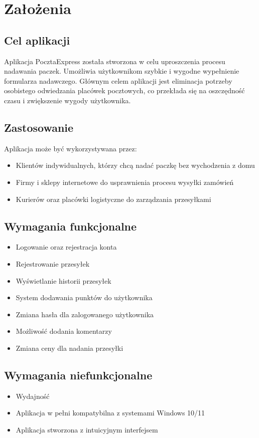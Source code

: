 \setcounter{section}{0}
\renewcommand{\thesection}{\arabic{section}}

\section{Założenia}
\subsection{Cel aplikacji}

Aplikacja PocztaExpress została stworzona w celu uproszczenia procesu nadawania paczek. Umożliwia użytkownikom szybkie i wygodne wypełnienie formularza nadawczego. Głównym celem aplikacji jest eliminacja potrzeby osobistego odwiedzania placówek pocztowych, co przekłada się na oszczędność czasu i zwiększenie wygody użytkownika.

\subsection{Zastosowanie}

Aplikacja może być wykorzystywana przez:
\begin{itemize}
\item Klientów indywidualnych, którzy chcą nadać paczkę bez wychodzenia z domu
\item Firmy i sklepy internetowe do usprawnienia procesu wysyłki zamówień
\item Kurierów oraz placówki logistyczne do zarządzania przesyłkami
\end{itemize}

\subsection{Wymagania funkcjonalne}
\begin{itemize}
\item Logowanie oraz rejestracja konta
\item Rejestrowanie przesyłek 
\item Wyświetlanie historii przesyłek
\item System dodawania punktów do użytkownika
\item Zmiana hasła dla zalogowanego użytkownika
\item Możliwość dodania komentarzy 
\item Zmiana ceny dla nadania przesyłki
\end{itemize}

\subsection{Wymagania niefunkcjonalne}
\begin{itemize}
\item Wydajność
\item Aplikacja w pełni kompatybilna z systemami Windows 10/11
\item Aplikacja stworzona z intuicyjnym interfejsem
\end{itemize}